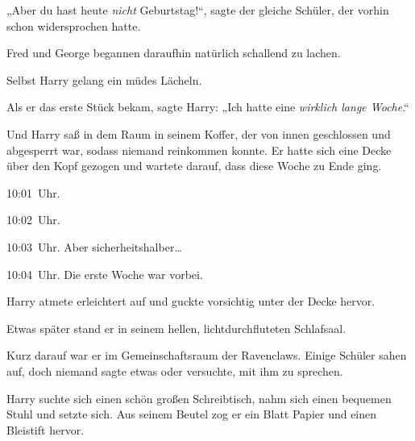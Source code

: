„Aber du hast heute \emph{nicht} Geburtstag!“, sagte der gleiche Schüler, der vorhin schon widersprochen hatte.

Fred und George begannen daraufhin natürlich schallend zu lachen.

Selbst Harry gelang ein müdes Lächeln.

Als er das erste Stück bekam, sagte Harry: „Ich hatte eine \emph{wirklich lange Woche}.“

\later

Und Harry saß in dem Raum in seinem Koffer, der von innen geschlossen und abgesperrt war, sodass niemand reinkommen konnte. Er hatte sich eine Decke über den Kopf gezogen und wartete darauf, dass diese Woche zu Ende ging.

10:01~Uhr.

10:02~Uhr.

10:03~Uhr. Aber sicherheitshalber…

10:04~Uhr. Die erste Woche war vorbei.

Harry atmete erleichtert auf und guckte vorsichtig unter der Decke hervor.

Etwas später stand er in seinem hellen, lichtdurchfluteten Schlafsaal.

Kurz darauf war er im Gemeinschaftsraum der Ravenclaws. Einige Schüler sahen auf, doch niemand sagte etwas oder versuchte, mit ihm zu sprechen.

Harry suchte sich einen schön großen Schreibtisch, nahm sich einen bequemen Stuhl und setzte sich. Aus seinem Beutel zog er ein Blatt Papier und einen Bleistift hervor.

